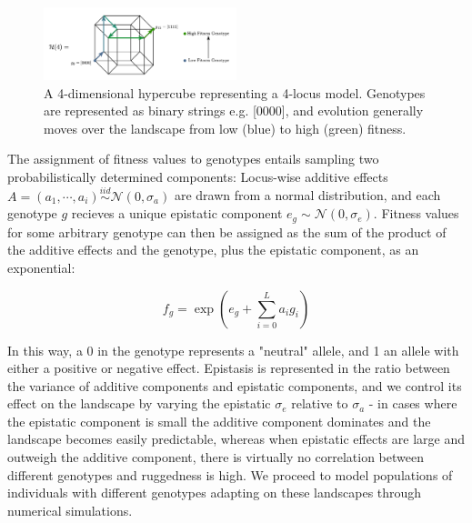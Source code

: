 \documentclass[paper=a4, fontsize=11pt,twoside]{scrartcl}       %
\begin{document}
\begin{figure}[h!]
	\centering
	\includegraphics[width = 0.5\textwidth]{figures/simple_landscape.png}
	\caption{A 4-dimensional hypercube representing a 4-locus model. Genotypes are represented as binary strings e.g. [0000], and evolution generally moves over the landscape from low (blue) to high (green) fitness.}
	\label{genotype_space}
\end{figure}

The assignment of fitness values to genotypes entails sampling two probabilistically determined components: Locus-wise additive effects $A = (a_1, \cdots, a_i) \overset{iid}{\sim} \mathcal{N}(0, \sigma_a)$ are drawn from a normal distribution, and each genotype $g$ recieves a unique epistatic component $e_g \sim \mathcal{N}(0, \sigma_e)$.  Fitness values for some arbitrary genotype can then be assigned as the sum of the product of the additive effects and the genotype, plus the epistatic component, as an exponential: 

$$f_g = \exp{\left(e_g + \sum_{i=0}^{L} a_i g_i\right)}$$

In this way, a 0 in the genotype represents a "neutral" allele, and 1 an allele with either a positive or negative effect. Epistasis is represented in the ratio between the variance of additive components and epistatic components, and we control its effect on the landscape by varying the epistatic $\sigma_e$ relative to $\sigma_a$ - in cases where the epistatic component is small the additive component dominates and the landscape becomes easily predictable, whereas when epistatic effects are large and outweigh the additive component, there is virtually no correlation between different genotypes and ruggedness is high. We proceed to model populations of individuals with different genotypes adapting on these landscapes through numerical simulations.
\end{document}
